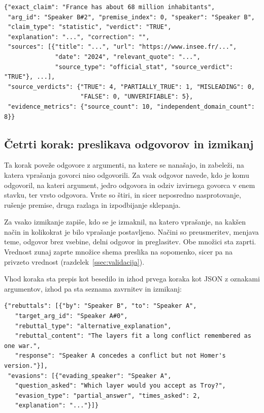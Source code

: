 \documentclass[a4paper, 12pt]{book}
\begin{document}
\begin{lstlisting}[basicstyle=\ttfamily\scriptsize,breaklines=true]
{"exact_claim": "France has about 68 million inhabitants",
 "arg_id": "Speaker B#2", "premise_index": 0, "speaker": "Speaker B",
 "claim_type": "statistic", "verdict": "TRUE",
 "explanation": "...", "correction": "",
 "sources": [{"title": "...", "url": "https://www.insee.fr/...",
              "date": "2024", "relevant_quote": "...",
              "source_type": "official_stat", "source_verdict": "TRUE"}, ...],
 "source_verdicts": {"TRUE": 4, "PARTIALLY_TRUE": 1, "MISLEADING": 0,
                     "FALSE": 0, "UNVERIFIABLE": 5},
 "evidence_metrics": {"source_count": 10, "independent_domain_count": 8}}
\end{lstlisting}

\subsection{Četrti korak: preslikava odgovorov in izmikanj}
\label{ssec:prehod4}

Ta korak poveže odgovore z argumenti, na katere se nanašajo, in zabeleži, na katera vprašanja govorci niso odgovorili. Za vsak odgovor navede, kdo je komu
odgovoril, na kateri argument, jedro odgovora in odziv izvirnega govorca v enem stavku, ter vrsto odgovora. Vrste so štiri, in sicer neposredno nasprotovanje,
rušenje premise, druga razlaga in izpodbijanje sklepanja.

Za vsako izmikanje zapiše, kdo se je izmaknil, na katero vprašanje, na kakšen način in kolikokrat je bilo vprašanje postavljeno. Načini so preusmeritev,
menjava teme, odgovor brez vsebine, delni odgovor in preglasitev. Obe množici sta zaprti. Vrednost zunaj zaprte množice shema preslika na sopomenko, sicer pa na privzeto vrednost
(razdelek~\ref{ssec:validacija}).

Vhod koraka sta prepis kot besedilo in izhod prvega koraka kot JSON z oznakami argumentov, izhod pa sta seznama zavrnitev in izmikanj:

\begin{lstlisting}[basicstyle=\ttfamily\scriptsize,breaklines=true]
{"rebuttals": [{"by": "Speaker B", "to": "Speaker A",
   "target_arg_id": "Speaker A#0",
   "rebuttal_type": "alternative_explanation",
   "rebuttal_content": "The layers fit a long conflict remembered as one war.",
   "response": "Speaker A concedes a conflict but not Homer's version."}],
 "evasions": [{"evading_speaker": "Speaker A",
   "question_asked": "Which layer would you accept as Troy?",
   "evasion_type": "partial_answer", "times_asked": 2,
   "explanation": "..."}]}
\end{lstlisting}
\end{document}
